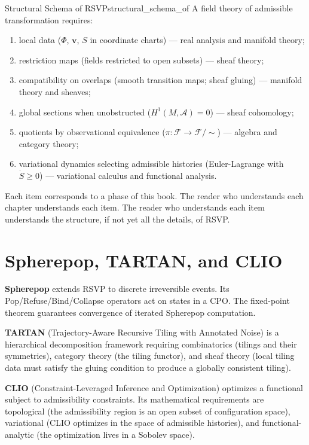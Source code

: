 \documentclass[12pt, twoside, openright, a4paper]{book}
\begin{document}
\begin{theorem}{Structural Schema of RSVP}{structural_schema_of}
A field theory of admissible transformation requires:
\begin{enumerate}
  \item local data ($\Phi$, $\mathbf{v}$, $S$ in coordinate charts) --- real analysis and manifold theory;
  \item restriction maps (fields restricted to open subsets) --- sheaf theory;
  \item compatibility on overlaps (smooth transition maps; sheaf gluing) --- manifold theory and sheaves;
  \item global sections when unobstructed ($H^1(M,\mathcal{A}) = 0$) --- sheaf cohomology;
  \item quotients by observational equivalence ($\pi: \mathcal{F} \to \mathcal{F}/{\sim}$) --- algebra and category theory;
  \item variational dynamics selecting admissible histories (Euler-Lagrange with $\dot S \geq 0$) --- variational calculus and functional analysis.
\end{enumerate}
\end{theorem}

Each item corresponds to a phase of this book.
The reader who understands each chapter understands each item.
The reader who understands each item understands the structure, if not yet all the details, of RSVP.

\section{Spherepop, TARTAN, and CLIO}

\textbf{Spherepop} extends RSVP to discrete irreversible events.
Its Pop/Refuse/Bind/Collapse operators act on states in a CPO.
The fixed-point theorem guarantees convergence of iterated Spherepop computation.

\textbf{TARTAN} (Trajectory-Aware Recursive Tiling with Annotated Noise) is a hierarchical decomposition framework requiring combinatorics (tilings and their symmetries), category theory (the tiling functor), and sheaf theory (local tiling data must satisfy the gluing condition to produce a globally consistent tiling).

\textbf{CLIO} (Constraint-Leveraged Inference and Optimization) optimizes a functional subject to admissibility constraints.
Its mathematical requirements are topological (the admissibility region is an open subset of configuration space), variational (CLIO optimizes in the space of admissible histories), and functional-analytic (the optimization lives in a Sobolev space).
\end{document}
